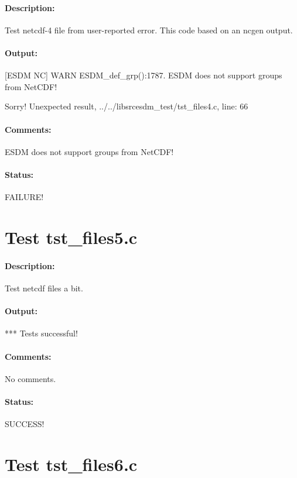 \paragraph{Description:} Test netcdf-4 file from user-reported error. This code based on an ncgen output.

\paragraph{Output:} [ESDM NC] WARN ESDM\_def\_grp():1787. ESDM does not support groups from NetCDF!

Sorry! Unexpected result, ../../libsrcesdm\_test/tst\_files4.c, line: 66

\paragraph{Comments:} ESDM does not support groups from NetCDF!

\paragraph{Status:} FAILURE!

\section{Test tst\_files5.c}

\paragraph{Description:} Test netcdf files a bit.

\paragraph{Output:} *** Tests successful!

\paragraph{Comments:} No comments.

\paragraph{Status:} SUCCESS!

\section{Test tst\_files6.c}

